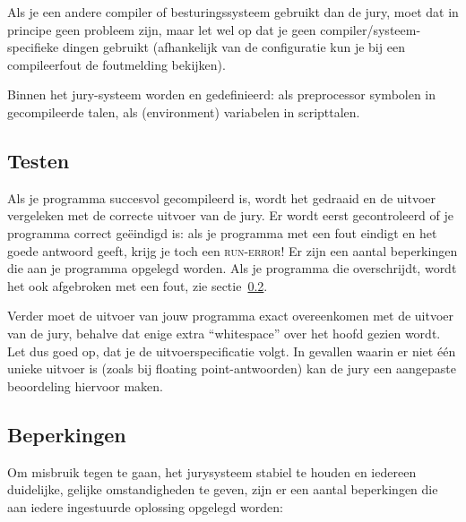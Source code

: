 Als je een andere compiler of besturingssysteem gebruikt dan de jury,
moet dat in principe geen probleem zijn, maar let wel op dat
je geen compiler/systeem-specifieke dingen gebruikt (afhankelijk van
de configuratie kun je bij een compileerfout de foutmelding bekijken).

Binnen het jury-systeem worden  en 
gedefinieerd: als preprocessor symbolen in gecompileerde talen, als
(environment) variabelen in scripttalen.

\subsection{Testen}\label{testing}

Als je programma succesvol gecompileerd is, wordt het gedraaid en de
uitvoer vergeleken met de correcte uitvoer van de jury. Er wordt eerst
gecontroleerd of je programma correct ge\"eindigd is: als je programma
met een fout eindigt en het goede antwoord geeft, krijg je toch een
\textsc{run-error}! Er zijn een aantal beperkingen die aan je programma
opgelegd worden. Als je programma die overschrijdt, wordt het ook
afgebroken met een fout, zie sectie~\ref{runlimits}.

Verder moet de uitvoer van jouw programma exact overeenkomen met de
uitvoer van de jury, behalve dat enige extra ``whitespace'' over het
hoofd gezien wordt. Let dus goed op, dat je de uitvoerspecificatie
volgt. In gevallen waarin er niet \'e\'en unieke uitvoer is (zoals bij
floating point-antwoorden) kan de jury een aangepaste beoordeling
hiervoor maken.

\subsection{Beperkingen}\label{runlimits}

Om misbruik tegen te gaan, het jurysysteem stabiel te houden en iedereen
duidelijke, gelijke omstandigheden te geven, zijn er een aantal
beperkingen die aan iedere ingestuurde oplossing opgelegd worden:

